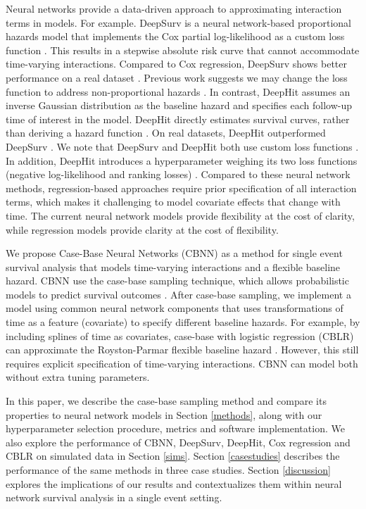 \documentclass[APA,LATO1COL]{WileyNJD-v2}
\begin{document}
Neural networks provide a data-driven approach to approximating interaction terms in models. For example.
DeepSurv is a neural network-based proportional hazards model that implements the Cox partial log-likelihood
as a custom loss function \citep{katzman2018DeepSurv}. This results in a stepwise absolute risk curve that cannot
accommodate time-varying interactions. Compared to Cox regression, DeepSurv shows better performance on a
real dataset \citep{katzman2018DeepSurv}. Previous work suggests we may change the loss function to address
non-proportional hazards \citep{faraggi1995neural}. In contrast, DeepHit assumes an inverse Gaussian distribution
as the baseline hazard \citep{lee2018DeepHit} and specifies each follow-up time of interest in the model. DeepHit
directly estimates survival curves, rather than deriving a hazard function \citep{lee2018DeepHit}. On real datasets,
DeepHit outperformed DeepSurv \citep{lee2018DeepHit}. We note that DeepSurv and DeepHit both use custom loss
functions \citep{katzman2018DeepSurv} \citep{lee2018DeepHit}. In addition, DeepHit introduces a hyperparameter
weighing its two loss functions (negative log-likelihood and ranking losses) \citep{lee2018DeepHit}. Compared
to these neural network methods, regression-based approaches require prior specification of all interaction terms,
which makes it challenging to model covariate effects that change with time. The current neural network models
provide flexibility at the cost of clarity, while regression models provide clarity at the cost of flexibility.

We propose Case-Base Neural Networks (CBNN) as a method for single event survival analysis that models
time-varying interactions and a flexible baseline hazard. CBNN use the case-base sampling technique, which
allows probabilistic models to predict survival outcomes \citep{hanley2009}. After case-base sampling, we
implement a model using common neural network components that uses transformations of time as a feature
(covariate) to specify different baseline hazards. For example, by including splines of time as covariates,
case-base with logistic regression (CBLR) can approximate the Royston-Parmar flexible baseline hazard
\citep{royston2002flexible} \citep{hanley2009}. However, this still requires explicit specification of
time-varying interactions. CBNN can model both without extra tuning parameters.

In this paper, we describe the case-base sampling method and compare its properties to neural
network models in Section \ref{methods}, along with our hyperparameter selection procedure,
metrics and software implementation. We also explore the performance of CBNN, DeepSurv,
DeepHit, Cox regression and CBLR on simulated data in Section \ref{sims}. Section \ref{casestudies}
describes the performance of the same methods in three case studies. Section \ref{discussion} explores
the implications of our results and contextualizes them within neural network survival analysis in a single
event setting.
\end{document}
